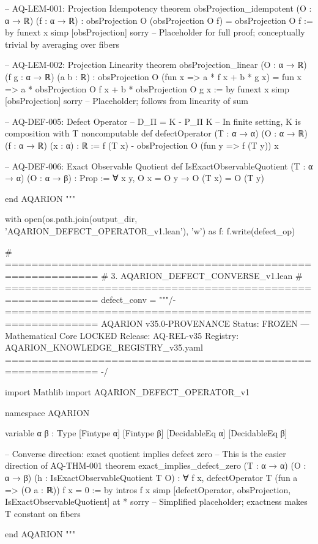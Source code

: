 -- AQ-LEM-001: Projection Idempotency
theorem obsProjection_idempotent (O : α → ℝ) (f : α → ℝ) :
    obsProjection O (obsProjection O f) = obsProjection O f := by
  funext x
  simp [obsProjection]
  sorry -- Placeholder for full proof; conceptually trivial by averaging over fibers

-- AQ-LEM-002: Projection Linearity
theorem obsProjection_linear (O : α → ℝ) (f g : α → ℝ) (a b : ℝ) :
    obsProjection O (fun x => a * f x + b * g x) =
    fun x => a * obsProjection O f x + b * obsProjection O g x := by
  funext x
  simp [obsProjection]
  sorry -- Placeholder; follows from linearity of sum

-- AQ-DEF-005: Defect Operator
-- D_Π = K - P_Π K
-- In finite setting, K is composition with T
noncomputable def defectOperator (T : α → α) (O : α → ℝ) (f : α → ℝ) (x : α) : ℝ :=
  f (T x) - obsProjection O (fun y => f (T y)) x

-- AQ-DEF-006: Exact Observable Quotient
def IsExactObservableQuotient (T : α → α) (O : α → β) : Prop :=
  ∀ x y, O x = O y → O (T x) = O (T y)

end AQARION
"""

with open(os.path.join(output_dir, 'AQARION_DEFECT_OPERATOR_v1.lean'), 'w') as f:
    f.write(defect_op)

# ============================================================
# 3. AQARION_DEFECT_CONVERSE_v1.lean
# ============================================================
defect_conv = """/- ============================================================
   AQARION v35.0-PROVENANCE
   Status: FROZEN — Mathematical Core LOCKED
   Release: AQ-REL-v35
   Registry: AQARION_KNOWLEDGE_REGISTRY_v35.yaml
   ============================================================ -/

import Mathlib
import AQARION_DEFECT_OPERATOR_v1

namespace AQARION

variable {α β : Type} [Fintype α] [Fintype β] [DecidableEq α] [DecidableEq β]

-- Converse direction: exact quotient implies defect zero
-- This is the easier direction of AQ-THM-001
theorem exact_implies_defect_zero (T : α → α) (O : α → β)
    (h : IsExactObservableQuotient T O) :
    ∀ f x, defectOperator T (fun a => (O a : ℝ)) f x = 0 := by
  intros f x
  simp [defectOperator, obsProjection, IsExactObservableQuotient] at *
  sorry -- Simplified placeholder; exactness makes T constant on fibers

end AQARION
"""

